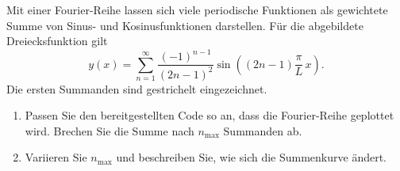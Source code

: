\begin{ExerciseBlock}
Mit einer Fourier-Reihe lassen sich viele periodische Funktionen als gewichtete Summe von Sinus- und Kosinusfunktionen darstellen. Für die abgebildete Dreiecksfunktion gilt
\[
 y(x)=\sum_{n=1}^{\infty}
 \frac{(-1)^{n-1}}{(2n-1)^2}
 \sin\left((2n-1)\frac{\pi}{L}\,x\right).
\]
Die ersten Summanden sind gestrichelt eingezeichnet.
\begin{center}
\end{center}
\begin{enumerate}
\item Passen Sie den bereitgestellten Code so an, dass die Fourier-Reihe geplottet wird. Brechen Sie die Summe nach $n_\mathrm{max}$ Summanden ab.
\item Variieren Sie $n_\mathrm{max}$ und beschreiben Sie, wie sich die Summenkurve ändert.
\end{enumerate}
\end{ExerciseBlock}
